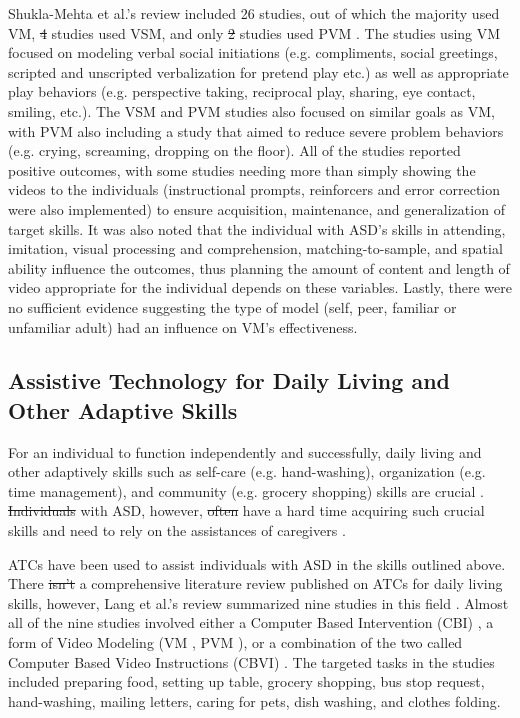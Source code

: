 \documentclass{ut-thesis}
\providecommand{\DIFaddtex}[1]{{\protect\color{blue}\uwave{#1}}} %
\providecommand{\DIFdeltex}[1]{{\protect\color{red}\sout{#1}}}                      %
\providecommand{\DIFaddbegin}{} %
\providecommand{\DIFaddend}{} %
\providecommand{\DIFdelbegin}{} %
\providecommand{\DIFdelend}{} %
\providecommand{\DIFadd}[1]{\texorpdfstring{\DIFaddtex{#1}}{#1}} %
\providecommand{\DIFdel}[1]{\texorpdfstring{\DIFdeltex{#1}}{}} %
\begin{document}
Shukla-Mehta et al.'s review included 26 studies, out of which the majority used VM, \DIFdelbegin \DIFdel{4 }\DIFdelend \DIFaddbegin \DIFadd{four }\DIFaddend studies used VSM, and only \DIFdelbegin \DIFdel{2 }\DIFdelend \DIFaddbegin \DIFadd{two }\DIFaddend studies used PVM \cite{shukla2009evaluating}.  The studies using VM focused on modeling verbal social initiations (e.g. compliments, social greetings, scripted and unscripted verbalization for pretend play etc.) as well as appropriate play behaviors (e.g. perspective taking, reciprocal play, sharing, eye contact, smiling, etc.).  The VSM and PVM studies also focused on similar goals as VM, with PVM also including a study that aimed to reduce severe problem behaviors (e.g. crying, screaming, dropping on the floor).  All of the studies reported positive outcomes, with some studies needing more than simply showing the videos to the individuals (instructional prompts, reinforcers and error correction were also implemented) to ensure acquisition, maintenance, and generalization of target skills.  It was also noted that the individual with ASD's skills in attending, imitation, visual processing and comprehension, matching-to-sample, and spatial ability influence the outcomes, thus planning the amount of content and length of video appropriate for the individual depends on these variables.  Lastly, there were no sufficient evidence suggesting the type of model (self, peer, familiar or unfamiliar adult) had an influence on VM's effectiveness.

\subsection{Assistive Technology for Daily Living and Other Adaptive Skills}
For an individual to function independently and successfully, daily living and other adaptively skills such as self-care (e.g. hand-washing), organization (e.g. time management), and community (e.g. grocery shopping) skills are crucial \cite{liss2001predictors}.  \DIFdelbegin \DIFdel{Individuals }\DIFdelend \DIFaddbegin \DIFadd{Some individuals }\DIFaddend with ASD, however, \DIFdelbegin \DIFdel{often }\DIFdelend have a hard time acquiring such crucial skills and need to rely on the assistances of caregivers \cite{smith2012developmental}.

ATCs have been used to assist individuals with ASD in the skills outlined above.  There \DIFdelbegin \DIFdel{isn't }\DIFdelend \DIFaddbegin \DIFadd{is not }\DIFaddend a comprehensive literature review published on ATCs for daily living skills, however, Lang et al.'s review summarized nine studies in this field \cite{lang2014assistive}.  Almost all of the nine studies involved either a Computer Based Intervention (CBI) \cite{hutcherson2004computer}, a form of Video Modeling (VM \cite{rosenberg2010evaluating}, PVM \cite{bereznak2012video, shipley2002teaching, sigafoos2007evaluation, sigafoos2005computer, van2010comparison}), or a combination of the two called Computer Based Video Instructions (CBVI) \cite{ayres2009acquisition, mechling2010computer}.  The targeted tasks in the studies included preparing food, setting up table, grocery shopping, bus stop request, hand-washing, mailing letters, caring for pets, dish washing, and clothes folding.
\end{document}
